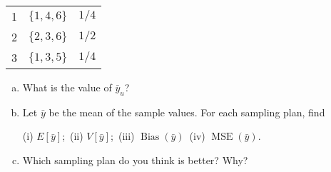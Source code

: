 \documentclass[12pt]{article}
\begin{document}
\begin{exercise}[Lohr-2.1]
\begin{itemize}
\begin{center}
\begin{tabular}{ccc}
                    \hline 1 & \(\{1,4,6\}\) & \(1 / 4\) \\
                    2 & \(\{2,3,6\}\) & \(1 / 2\) \\
                    3 & \(\{1,3,5\}\) & \(1 / 4\)
                \end{tabular}
            \end{center}
        \end{itemize}
        \begin{enumerate}[(a)]
            \item What is the value of \(\bar{y}_u\)? 
            \item Let \(\bar{y}\) be the mean of the sample values. For each sampling plan, find
            
            (i) \(E[\bar{y}]\);\ 
            (ii) \(V[\bar{y}]\);\ 
            (iii) \(\operatorname{Bias}(\bar{y})\)\ 
            (iv) \(\operatorname{MSE}(\bar{y})\). 
            \item Which sampling plan do you think is better? Why?
        \end{enumerate}
    \end{exercise}
\end{document}
